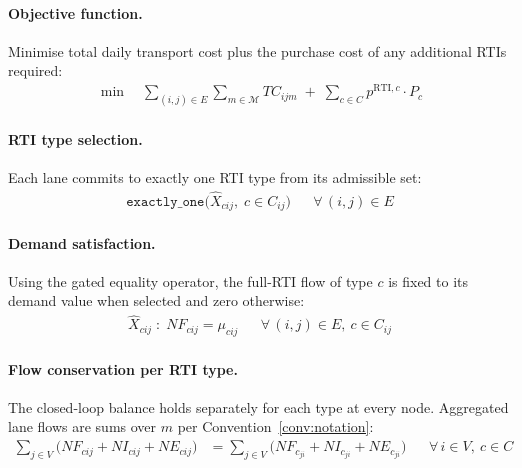 
\paragraph{Objective function.}
Minimise total daily transport cost plus the purchase cost of any
additional RTIs required:
%
\begin{align}
  \min \quad
  \sum_{(i,j)\in E}\sum_{m\in\mathcal{M}} TC_{ijm}
  \;+\;
  \sum_{c\in C} p^{\text{RTI},c} \cdot P_{c}
  \label{eq:objective}
\end{align}


\paragraph{RTI type selection.}
Each lane commits to exactly one RTI type from its admissible set:
%
\begin{align}
  \texttt{exactly\_one}\bigl(\hat{X}_{cij},\;
  c \in C_{ij}\bigr)
  && \forall\,(i,j) \in E
  \label{eq:type-selection}
\end{align}


\paragraph{Demand satisfaction.}
Using the gated equality operator, the full-RTI flow of type $c$
is fixed to its demand value when selected and zero otherwise:
%
\begin{align}
  \hat{X}_{cij} \;:\; NF_{cij} = \mu_{cij}
  && \forall\,(i,j)\in E,\ c\in C_{ij}
  \label{eq:demand}
\end{align}


\paragraph{Flow conservation per RTI type.}
The closed-loop balance holds separately for each type at every
node. Aggregated lane flows are sums over $m$ per
Convention~\ref{conv:notation}:
%
\begin{align}
  \sum_{j\in V}\!\bigl(NF_{cij}+NI_{cij}+NE_{cij}\bigr)
  &=
  \sum_{j\in V}\!\bigl(NF_{c}_{ji}+NI_{c}_{ji}+NE_{c}_{ji}\bigr)
  && \forall\, i\in V,\ c\in C
  \label{eq:conservation}
\end{align}

